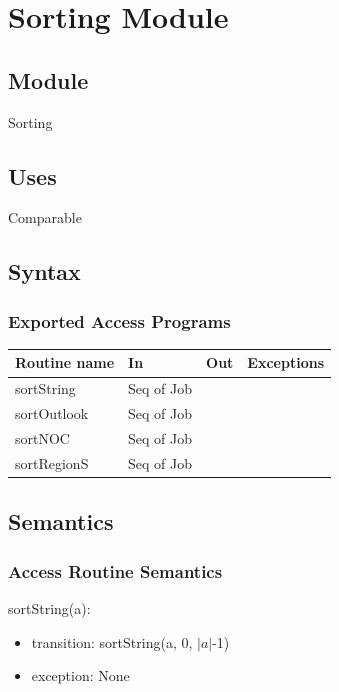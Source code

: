 \documentclass[12pt]{article}
\begin{document}
\newpage

\section* {Sorting Module}

\subsection* {Module}

Sorting

\subsection* {Uses}

Comparable

\subsection* {Syntax}

\subsubsection* {Exported Access Programs}

\begin{tabular}{| l | l | l | p{6cm} |}
\hline
\textbf{Routine name} & \textbf{In} & \textbf{Out} & \textbf{Exceptions}\\
\hline
sortString & Seq of Job & ~ & \\
\hline
sortOutlook & Seq of Job & ~ & \\
\hline
sortNOC & Seq of Job & ~ & \\
\hline
sortRegionS & Seq of Job & ~ & \\
\hline
\end{tabular}

\subsection* {Semantics}

\subsubsection* {Access Routine Semantics}

\noindent sortString(a):
\begin{itemize}
\item transition: sortString(a, 0, $|a|$-1)
\item exception: None
\end{itemize}
\end{document}

